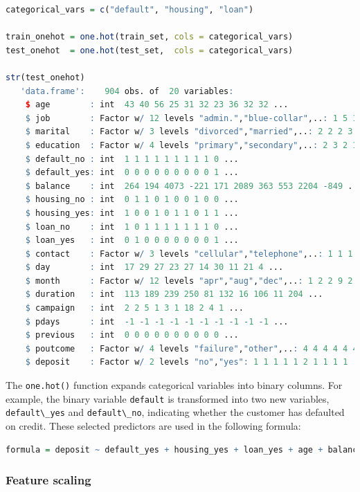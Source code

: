 \documentclass[
  11pt,
]{book}
\newcommand{\passthrough}[1]{#1}
\theoremstyle{definition}
\theoremstyle{definition}
\theoremstyle{definition}
\theoremstyle{definition}
\theoremstyle{remark}
\begin{document}
\begin{lstlisting}[language=R]
categorical_vars = c("default", "housing", "loan")

train_onehot = one.hot(train_set, cols = categorical_vars)
test_onehot  = one.hot(test_set,  cols = categorical_vars)

str(test_onehot)
   'data.frame':    904 obs. of  20 variables:
    $ age        : int  43 40 56 25 31 32 23 36 32 32 ...
    $ job        : Factor w/ 12 levels "admin.","blue-collar",..: 1 5 10 2 10 2 8 5 10 3 ...
    $ marital    : Factor w/ 3 levels "divorced","married",..: 2 2 2 3 2 2 3 3 3 3 ...
    $ education  : Factor w/ 4 levels "primary","secondary",..: 2 3 2 1 2 2 3 3 3 1 ...
    $ default_no : int  1 1 1 1 1 1 1 1 1 0 ...
    $ default_yes: int  0 0 0 0 0 0 0 0 0 1 ...
    $ balance    : int  264 194 4073 -221 171 2089 363 553 2204 -849 ...
    $ housing_no : int  0 1 1 0 1 0 0 1 0 0 ...
    $ housing_yes: int  1 0 0 1 0 1 1 0 1 1 ...
    $ loan_no    : int  1 0 1 1 1 1 1 1 1 0 ...
    $ loan_yes   : int  0 1 0 0 0 0 0 0 0 1 ...
    $ contact    : Factor w/ 3 levels "cellular","telephone",..: 1 1 1 3 1 1 3 1 1 1 ...
    $ day        : int  17 29 27 23 27 14 30 11 21 4 ...
    $ month      : Factor w/ 12 levels "apr","aug","dec",..: 1 2 2 9 2 10 9 2 10 4 ...
    $ duration   : int  113 189 239 250 81 132 16 106 11 204 ...
    $ campaign   : int  2 2 5 1 3 1 18 2 4 1 ...
    $ pdays      : int  -1 -1 -1 -1 -1 -1 -1 -1 -1 -1 ...
    $ previous   : int  0 0 0 0 0 0 0 0 0 0 ...
    $ poutcome   : Factor w/ 4 levels "failure","other",..: 4 4 4 4 4 4 4 4 4 4 ...
    $ deposit    : Factor w/ 2 levels "no","yes": 1 1 1 1 1 2 1 1 1 1 ...
\end{lstlisting}

The \passthrough{\lstinline!one.hot()!} function expands categorical variables into binary columns. For example, the binary variable \passthrough{\lstinline!default!} is transformed into two new variables, \passthrough{\lstinline!default\_yes!} and \passthrough{\lstinline!default\_no!}, indicating whether the customer has defaulted on credit. These selected predictors are used in the following formula:

\begin{lstlisting}[language=R]
formula = deposit ~ default_yes + housing_yes + loan_yes + age + balance + duration + campaign + pdays + previous
\end{lstlisting}

\subsubsection*{Feature scaling}\label{feature-scaling-3}
\end{document}
